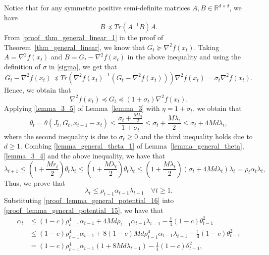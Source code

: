 \documentclass[11pt]{article}
\numberwithin{assumption}{section}
\numberwithin{remark}{section}
\numberwithin{theorem}{section}
\begin{document}
Notice that for any symmetric positive semi-definite matrices $A, B \in \mathbb{R}^{d \times d}$, we have
\begin{equation}
B \preceq Tr(A^{-1}B)A.
\end{equation}
From \eqref{proof_thm_general_linear_1} in the proof of Theorem~\ref{thm_general_linear}, we know that $G_t \succeq \nabla^2{f(x_t)}$. Taking $A = \nabla^2{f(x_t)}$ and $B = G_t - \nabla^2{f(x_t)}$ in the above inequality and using the definition of $\sigma$ in \eqref{sigma}, we get that
\begin{equation}
G_t - \nabla^2{f(x_t)} \preceq Tr(\nabla^2{f(x_t)}^{-1}(G_t - \nabla^2{f(x_t)}))\nabla^2{f(x_t)} = \sigma_t \nabla^2{f(x_t)}.
\end{equation}
Hence, we obtain that
\begin{equation}
\nabla^2{f(x_t)} \preceq G_t \preceq (1 + \sigma_t)\nabla^2{f(x_t)}.
\end{equation}
Applying \eqref{lemma_3_5} of Lemma~\ref{lemma_3} with $\eta = 1 +\sigma_t$, we obtain that
\begin{equation}
    \theta_t = \theta(J_t, G_t, x_{t + 1} - x_{t}) \leq \frac{\sigma_t + \frac{M\lambda_{t}}{2}}{1 + \sigma_t} \leq \sigma_t + \frac{M\lambda_{t}}{2} \leq \sigma_t + 4Md\lambda_{t},
\end{equation}
where the second inequality is due to $\sigma_t \geq 0$ and the third inequality holds due to $d \geq 1$. Combing \eqref{lemma_general_theta_1} of Lemma~\ref{lemma_general_theta}, \eqref{lemma_3_4} and the above inequality, we have that
\begin{equation}
    \lambda_{t + 1} \leq (1 + \frac{Mr_t}{2})\theta_t\lambda_t \leq (1 + \frac{M\lambda_t}{2})\theta_t\lambda_t \leq (1 + \frac{M\lambda_t}{2})(\sigma_t + 4Md\lambda_{t})\lambda_t = \rho_t \alpha_t \lambda_{t},
\end{equation}
Thus, we prove that
\begin{equation}\label{proof_lemma_general_potential_16}
    \lambda_t \leq \rho_{t - 1} \alpha_{t - 1} \lambda_{t - 1} \quad \forall t \geq 1.
\end{equation}
Substituting \eqref{proof_lemma_general_potential_16} into \eqref{proof_lemma_general_potential_15}, we have that
\begin{equation}
\begin{split}
    \alpha_t & \leq (1 - c)\rho_{t - 1}^4 \alpha_{t - 1} + 4Md\rho_{t - 1} \alpha_{t - 1} \lambda_{t - 1} - \frac{1}{4}(1 - c)\theta_{t - 1}^2\\
    & \leq (1 - c)\rho_{t - 1}^4 \alpha_{t - 1} + 8(1 - c)Md\rho_{t - 1}^4 \alpha_{t - 1} \lambda_{t - 1} - \frac{1}{4}(1 - c)\theta_{t - 1}^2\\
    & = (1 - c)\rho_{t - 1}^4 \alpha_{t - 1}(1 + 8Md\lambda_{t - 1}) - \frac{1}{4}(1 - c)\theta_{t - 1}^2,
\end{split}
\end{equation}
\end{document}
